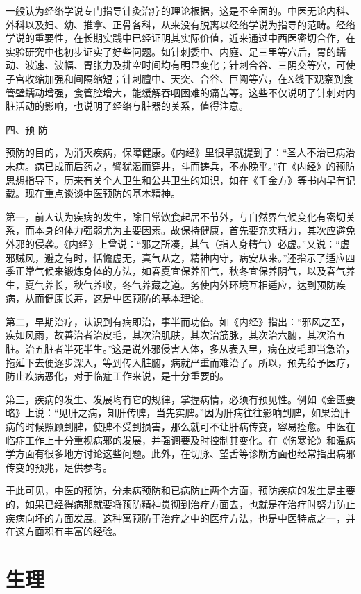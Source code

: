\documentclass[a4paper,12pt,UTF8,twoside]{ctexbook}
\begin{document}
一般认为经络学说专门指导针灸治疗的理论根据，这是不全面的。中医无论内科、外科以及妇、幼、推拿、正骨各科，从来没有脱离以经络学说为指导的范畴。经络学说的重要性，在长期实践中已经证明其实际价值，近来通过中西医密切合作，在实验研究中也初步证实了好些问题。如针刺委中、内庭、足三里等穴后，胃的蠕动、波速、波幅、胃张力及排空时间均有明显变化；针刺合谷、三阴交等穴，可使子宫收缩加强和间隔缩短；针刺膻中、天突、合谷、巨阙等穴，在X线下观察到食管壁蠕动增强，食管腔增大，能缓解吞咽困难的痛苦等。这些不仅说明了针刺对内脏活动的影响，也说明了经络与脏器的关系，值得注意。

四、预 防

预防的目的，为消灭疾病，保障健康。《内经》里很早就提到了：“圣人不治已病治未病。病已成而后药之，譬犹渴而穿井，斗而铸兵，不亦晚乎。”在《内经》的预防思想指导下，历来有关个人卫生和公共卫生的知识，如在《千金方》等书内早有记载。现在重点谈谈中医预防的基本精神。

第一，前人认为疾病的发生，除日常饮食起居不节外，与自然界气候变化有密切关系，而本身的体力强弱尤为主要因素。故保持健康，首先要充实精力，其次应避免外邪的侵袭。《内经》上曾说：“邪之所凑，其气（指人身精气）必虚。”又说：“虚邪贼风，避之有时，恬憺虚无，真气从之，精神内守，病安从来。”还指示了适应四季正常气候来锻炼身体的方法，如春夏宜保养阳气，秋冬宜保养阴气，以及春气养生，夏气养长，秋气养收，冬气养藏之道。务使内外环境互相适应，达到预防疾病，从而健康长寿，这是中医预防的基本理论。

第二，早期治疗，认识到有病即治，事半而功倍。如《内经》指出：“邪风之至，疾如风雨，故善治者治皮毛，其次治肌肤，其次治筋脉，其次治六腑，其次治五脏。治五脏者半死半生。”这是说外邪侵害人体，多从表入里，病在皮毛即当急治，拖延下去便逐步深入，等到传入脏腑，病就严重而难治了。所以，预先给予医疗，防止疾病恶化，对于临症工作来说，是十分重要的。

第三，疾病的发生、发展均有它的规律，掌握病情，必须有预见性。例如《金匮要略》上说：“见肝之病，知肝传脾，当先实脾。”因为肝病往往影响到脾，如果治肝病的时候照顾到脾，使脾不受到损害，那么就可不让肝病传变，容易痊愈。中医在临症工作上十分重视病邪的发展，并强调要及时控制其变化。在《伤寒论》和温病学方面有很多地方讨论这些问题。此外，在切脉、望舌等诊断方面也经常指出病邪传变的预兆，足供参考。

于此可见，中医的预防，分未病预防和已病防止两个方面，预防疾病的发生是主要的，如果已经得病那就要将预防精神贯彻到治疗方面去，也就是在治疗时努力防止疾病向坏的方面发展。这种寓预防于治疗之中的医疗方法，也是中医特点之一，并在这方面积有丰富的经验。

\section{生理}
\end{document}
